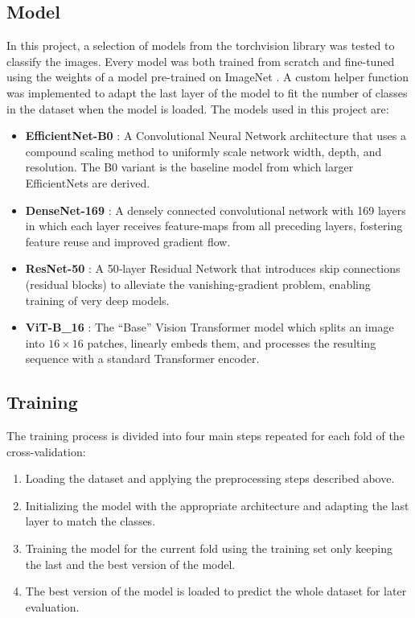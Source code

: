     \subsection{Model}

    In this project, a selection of models from the torchvision library was tested to classify the images. 
    Every model was both trained from scratch and fine-tuned using the weights of a model pre-trained on ImageNet \autocite{dengImageNetLargescaleHierarchical2009}.
    A custom helper function was implemented to adapt the last layer of the model to fit the number of classes in the dataset when the model is loaded.
    The models used in this project are:

    \begin{itemize}
        \item \textbf{EfficientNet-B0} \autocite{tanEfficientNetRethinkingModel2019}:  
        A Convolutional Neural Network architecture that uses a compound scaling method to uniformly scale network width, depth, and resolution.  
        The B0 variant is the baseline model from which larger EfficientNets are derived.  

        \item \textbf{DenseNet-169} \autocite{huangDenselyConnectedConvolutional2017}:  
        A densely connected convolutional network with 169 layers in which each layer receives feature-maps from all preceding layers, fostering feature reuse and improved gradient flow.  

        \item \textbf{ResNet-50} \autocite{heDeepResidualLearning2016}:  
        A 50‐layer Residual Network that introduces skip connections (residual blocks) to alleviate the vanishing-gradient problem, enabling training of very deep models.  

        \item \textbf{ViT-B\_16} \autocite{dosovitskiyImageWorth16x162021}:  
        The “Base” Vision Transformer model which splits an image into \(16\times 16\) patches, linearly embeds them, and processes the resulting sequence with a standard Transformer encoder.  
    \end{itemize}

    \subsection{Training}

    The training process is divided into four main steps repeated for each fold of the cross-validation:
    \begin{enumerate}
        \item Loading the dataset and applying the preprocessing steps described above.
        \item Initializing the model with the appropriate architecture and adapting the last layer to match the classes.
        \item Training the model for the current fold using the training set only keeping the last and the best version of the model.
        \item The best version of the model is loaded to predict the whole dataset for later evaluation.
    \end{enumerate}


